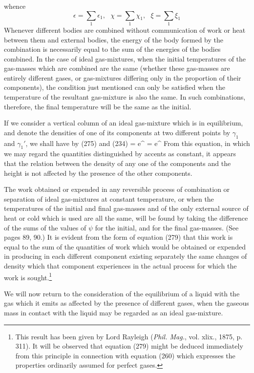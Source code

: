 \documentclass[12pt]{memoir}
\begin{document}
whence        $$\epsilon = \sum_1 \epsilon_1, \ \ \ \chi = \sum_1 \chi_1,\ \ \ \xi = \sum_1 \xi_1$$
Whenever different bodies are combined without communication of work or heat between them and external bodies, the energy of the body formed by the combination is necessarily equal to the sum of the energies of the bodies combined. In the case of ideal gas-mixtures, when the initial temperatures of the gas-masses which are combined are the same (whether these gas-masses are entirely different gases, or gas-mixtures differing only in the proportion of their components), the condition just mentioned can only be satisfied when the temperature of the resultant gas-mixture is also the same.  In such combinations, therefore, the final temperature will be the same as the initial.


If we consider a vertical column of an ideal gas-mixture which is
in equilibrium, and denote the densities of one of its components at two different points by $\gamma_1$ and $\gamma_1'$, we shall have by (275) and (234)
\eqs {} = e^{} = e^{}    \label{284}\eqe
From this equation, in which we may regard the quantities distinguished by accents as constant, it appears that the relation between the density of any one of the components and the height is not affected by the presence of the other components.


The work obtained or expended in any reversible process of combination or separation of ideal gas-mixtures at constant temperature, or when the temperatures of the initial and final gas-masses and of the only external source of heat or cold which is used are all the same, will be found by taking the difference of the sums of the values of $\psi$ for the initial, and for the final gas-masses. (See pages 89, 90.) It is evident from the form of equation (279) that this work is equal to the sum of the quantities of work which would be obtained or expended in producing in each different component existing separately the same changes of density which that component experiences in the actual process for which the work is sought.\footnote{This result has been given by Lord Rayleigh (\textit{Phil. Mag.}, vol. xlix., 1875, p. 311). It will be observed that equation (279) might be deduced immediately from this principle in connection with equation (260) which expresses the properties ordinarily assumed for perfect gases.}


We will now return to the consideration of the equilibrium of a liquid with the gas which it emits as affected by the presence of different gases, when the gaseous mass in contact with the liquid may be regarded as an ideal gas-mixture.
\end{document}
